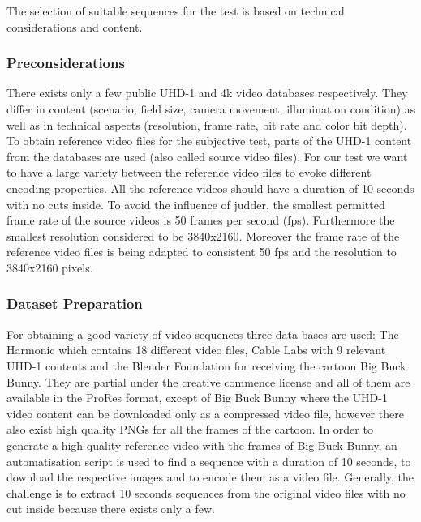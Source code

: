 The selection of suitable sequences for the test is based on technical considerations and content. 
\newline

\subsubsection{Preconsiderations}
There exists only a few public UHD-1 and 4k video databases respectively. They differ in content (scenario, field size, camera movement, illumination condition) as well as in technical aspects (resolution, frame rate, bit rate and color bit depth). 
To obtain reference video files for the subjective test, parts of the UHD-1 content from the databases are used (also called source video files).
For our test we want to have a large variety between the reference video files to evoke different encoding properties. 
All the reference videos should have a duration of 10 seconds with no cuts inside.
To avoid the influence of judder, the smallest permitted frame rate of the source videos is 50 frames per second (fps). Furthermore the smallest resolution considered to be 3840x2160. Moreover the frame rate of the reference video files is being adapted to consistent 50 fps and the resolution to 3840x2160 pixels.
\newline

\subsubsection{Dataset Preparation}
For obtaining a good variety of video sequences three data bases are used: The Harmonic \cite{web:harmonic} which contains 18 different video files, Cable Labs \cite{web:cablelabs} with 9 relevant UHD-1 contents and the Blender Foundation \cite{web:bbb} for receiving the cartoon Big Buck Bunny. They  are partial under the creative commence license and all of them are available in the ProRes format, except of Big Buck Bunny where the UHD-1 video content can be downloaded only as a compressed video file, however there also exist high quality PNGs for all the frames of the cartoon. In order to generate a high quality reference video with the frames of Big Buck Bunny, an automatisation script is used to find a sequence with a duration of 10 seconds, to download the respective images and to encode them as a video file.
Generally, the challenge is to extract 10 seconds sequences from the original video files with no cut inside because there exists only a few.

